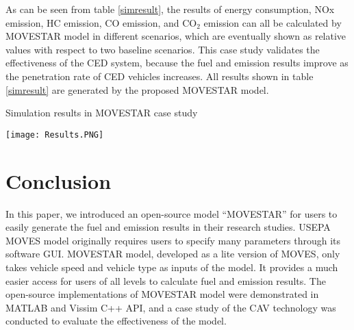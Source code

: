 \documentclass{article}
\begin{document}
As can be seen from table \ref{simresult}, the results of energy consumption, NOx emission, HC emission, CO emission, and CO$_2$ emission can all be calculated by MOVESTAR model in different scenarios, which are eventually shown as relative values with respect to two baseline scenarios. This case study validates the effectiveness of the CED system, because the fuel and emission results improve as the penetration rate of CED vehicles increases. All results shown in table \ref{simresult} are generated by the proposed MOVESTAR model.

\begin{table}[ht!]
    \centering
    \caption{Simulation results in MOVESTAR case study}
    \texttt{[image: Results.PNG]}
    \label{simresult}
\end{table}


\section{Conclusion}
\label{sec:conclusion}
In this paper, we introduced an open-source model ``MOVESTAR'' for users to easily generate the fuel and emission results in their research studies. USEPA MOVES model originally requires users to specify many parameters through its software GUI. MOVESTAR model, developed as a lite version of MOVES, only takes vehicle speed and vehicle type as inputs of the model. It provides a much easier access for users of all levels to calculate fuel and emission results. The open-source implementations of MOVESTAR model were demonstrated in MATLAB and Vissim C++ API, and a case study of the CAV technology was conducted to evaluate the effectiveness of the model.





\end{document}
